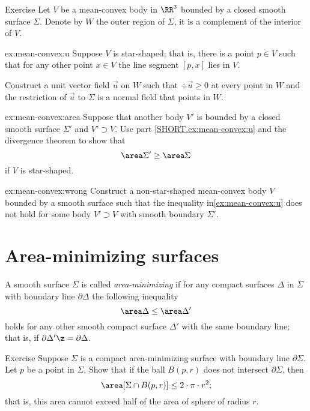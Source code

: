 \begin{thm}{Exercise}\label{ex:mean-convex}
Let $V$ be a mean-convex body in $\RR^3$ bounded by a closed smooth surface $\Sigma$.
Denote by $W$ the outer region of $\Sigma$, it is a complement of the interior of $V$.

\begin{subthm}{ex:mean-convex:u}
Suppose $V$ is star-shaped; that is, there is a point $p\in V$ such that for any other point $x\in V$ the line segment $[p,x]$ lies in $V$.

Construct a unit vector field $\vec u$ on $W$ such that $\div  \vec u\ge 0$ at every point in $W$ and the restriction of $\vec u$ to $\Sigma$ is a normal field that points in $W$.
\end{subthm}
 
\begin{subthm}{ex:mean-convex:area} Suppose that another body $V'$ is bounded by a closed smooth surface $\Sigma'$ and $V'\supset V$.
Use part \ref{SHORT.ex:mean-convex:u} and the divergence theorem to show that 
\[\area\Sigma'\ge \area\Sigma\]
if $V$ is star-shaped.
\end{subthm}

\begin{subthm}{ex:mean-convex:wrong} Construct a non-star-shaped mean-convex body $V$ bounded by a smooth surface such that the inequality in\ref{ex:mean-convex:u} does not hold for some body $V'\supset V$ with smooth boundary $\Sigma'$.
\end{subthm}
\end{thm}

\section{Area-minimizing surfaces}

A smooth surface $\Sigma$ is called \emph{area-minimizing} if for any compact surfaces $\Delta$ in $\Sigma$ with boundary line $\partial \Delta$ 
the following inequality 
\[\area \Delta\le \area \Delta'\]
holds for any other smooth compact surface $\Delta'$ with the same boundary line; that is, if $\partial\Delta'\z=\partial\Delta$.

\begin{thm}{Exercise}\label{ex:area-ball-intersection}
Suppose $\Sigma$ is a compact area-minimizing surface with boundary line $\partial \Sigma$.
Let $p$ be a point in $\Sigma$.
Show that if the ball $B(p,r)$ does not intersect $\partial \Sigma$, then 
\[\area [\Sigma\cap B(p,r)]\le 2\cdot \pi\cdot r^2;\]
that is, this area cannot exceed half of the area of sphere of radius $r$.
\end{thm}


